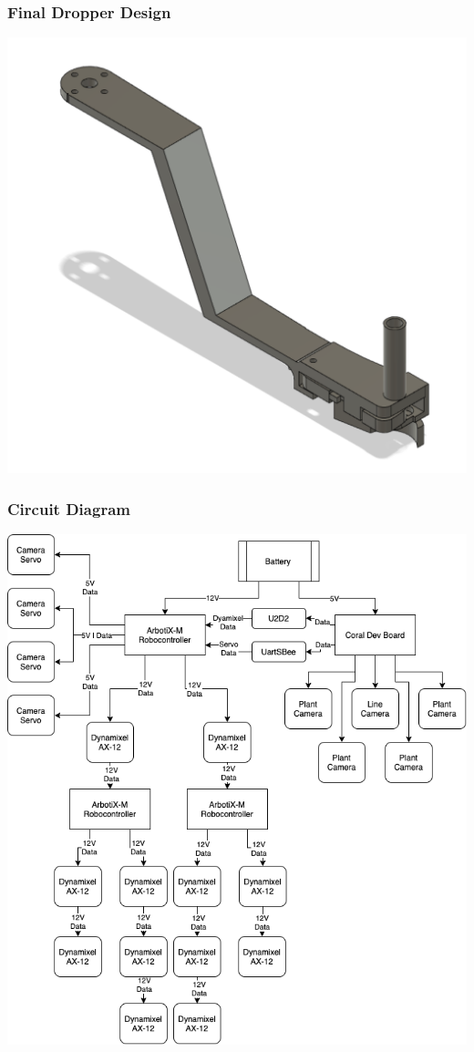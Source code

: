 \documentclass[11pt, hidelinks]{report}
\begin{document}
\subsubsection{Final Dropper Design} \label{app:Dropper}
	\begin{center}
	    \includegraphics[scale=.4]{Dropper.png}
	\end{center}
	
\subsubsection{Circuit Diagram} \label{app:circuit}
    \begin{center}
	    \includegraphics[scale=.45]{circuit.png}
	\end{center}
\end{document}
